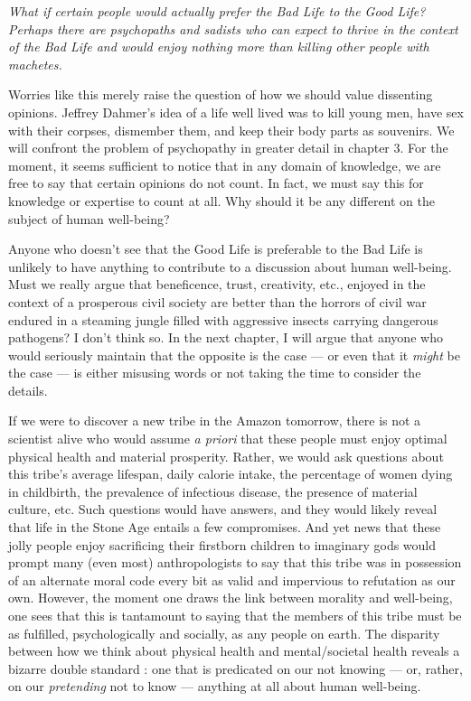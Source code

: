 \documentclass[a4paper,12pt]{extbook}
\begin{document}
\textit{What if certain people would actually prefer the Bad Life to the Good Life? 
Perhaps there are psychopaths and sadists who can expect to thrive in the context of the Bad Life and would enjoy nothing more than killing other people with machetes.} 

Worries like this merely raise the question of how we should value dissenting opinions. 
Jeffrey Dahmer’s idea of a life well lived was to kill young men, have sex with their corpses, dismember them, and keep their body parts as souvenirs. 
We will confront the problem of psychopathy in greater detail in chapter 3. 
For the moment, it seems sufficient to notice that in any domain of knowledge, we are free to say that certain opinions do not count. 
In fact, we must say this for knowledge or expertise to count at all. 
Why should it be any different on the subject of human well-being?  

Anyone who doesn’t see that the Good Life is preferable to the Bad Life is unlikely to have anything to contribute to a discussion about human well-being. 
Must we really argue that beneficence, trust, creativity, etc., enjoyed in the context of a prosperous civil society are better than the horrors of civil war endured in a steaming jungle filled with aggressive insects carrying dangerous pathogens? 
I don’t think so. 
In the next chapter, I will argue that anyone who would seriously maintain that the opposite is the case --- or even that it \textit{might} be the case --- is either misusing words or not taking the time to consider the details. 

If we were to discover a new tribe in the Amazon tomorrow, there is not a scientist alive who would assume \textit{a priori} that these people must enjoy optimal physical health and material prosperity. 
Rather, we would ask questions about this tribe’s average lifespan, daily calorie intake, the percentage of women dying in childbirth, the prevalence of infectious disease, the presence of material culture, etc. 
Such questions would have answers, and they would likely reveal that life in the Stone Age entails a few compromises. 
And yet news that these jolly people enjoy sacrificing their firstborn children to imaginary gods would prompt many (even most) anthropologists to say that this tribe was in possession of an alternate moral code every bit as valid and impervious to refutation as our own. 
However, the moment one draws the link between morality and well-being, one sees that this is tantamount to saying that the members of this tribe must be as fulfilled, psychologically and socially, as any people on earth. 
The disparity between how we think about physical health and mental/societal health reveals a bizarre double standard : 
one that is predicated on our not knowing --- or, rather, on our \textit{pretending} not to know --- anything at all about human well-being. 
\end{document}
